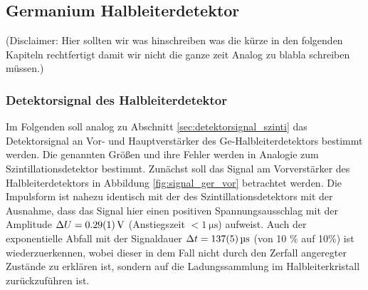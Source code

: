 \documentclass[11pt, a4paper]{article}
\numberwithin{equation}{section}
\begin{document}
\subsection{Germanium Halbleiterdetektor}
(Disclaimer: Hier sollten wir was hinschreiben was die kürze in den folgenden Kapiteln rechtfertigt damit wir nicht die ganze zeit Analog zu blabla schreiben müssen.)


\subsubsection{Detektorsignal des Halbleiterdetektor}
Im Folgenden soll analog zu Abschnitt \ref{sec:detektorsignal_szinti} das Detektorsignal an Vor- und Hauptverstärker des Ge-Halbleiterdetektors bestimmt werden.
Die genannten Größen und ihre Fehler werden in Analogie zum Szintillationsdetektor bestimmt.
Zunächst soll das Signal am Vorverstärker des Halbleiterdetektors in Abbildung \ref{fig:signal_ger_vor} betrachtet werden.
Die Impulsform ist nahezu identisch mit der des Szintillationsdetektors mit der Ausnahme, dass das Signal hier einen positiven Spannungsausschlag mit der Amplitude $\Delta U = \SI{0.29 +-0.01}{\volt}$ (Anstiegszeit $<\SI{1}{\micro\second}$) aufweist.
Auch der exponentielle Abfall mit der Signaldauer $\Delta t = \SI{137 +- 5}{\micro\second}$ (von 10 \% auf 10\%) ist wiederzuerkennen, wobei dieser in dem Fall nicht durch den Zerfall angeregter Zustände zu erklären ist, sondern auf die Ladungssammlung im Halbleiterkristall zurückzuführen ist.
\end{document}
